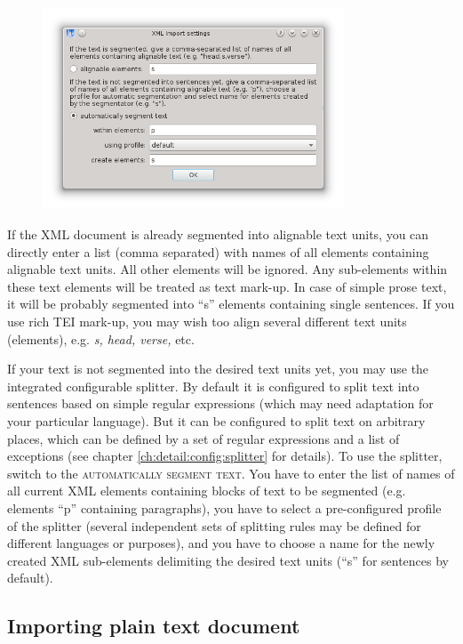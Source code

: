 \documentclass[a4paper,10pt,oneside]{book}
\newcommand{\menu}[1]{\textsc{#1}}
\begin{document}
\begin{figure}[htbf]
 \includegraphics[width=0.8\textwidth]{screenshots/xml_import.png}
\end{figure}

If the XML document is already segmented into alignable text units, you can directly enter a list (comma separated) with names of all elements containing alignable text units. All other elements will be ignored. Any sub-elements within these text elements will be treated as text mark-up. In case of simple prose text, it will be probably segmented into ``s'' elements containing single sentences. If you use rich TEI mark-up, you may wish too align several different text units (elements), e.g. \emph{s, head, verse,} etc.

If your text is not segmented into the desired text units yet, you may use the integrated configurable splitter. By default it is configured to split text into sentences based on simple regular expressions (which may need adaptation for your particular language). But it can be configured to split text on arbitrary places, which can be defined by a set of regular expressions and a list of exceptions (see chapter \ref{ch:detail:config:splitter} for details). To use the splitter, switch to the \menu{automatically segment text}. You have to enter the list of names of all current XML elements containing blocks of text to be segmented (e.g. elements ``p'' containing paragraphs), you have to select a pre-configured profile of the splitter (several independent sets of splitting rules may be defined for different languages or purposes), and you have to choose a name for the newly created XML sub-elements delimiting the desired text units (``s'' for sentences by default).

\subsection{Importing plain text document}\label{ch:detail:managing_local:new:txt}
\end{document}
